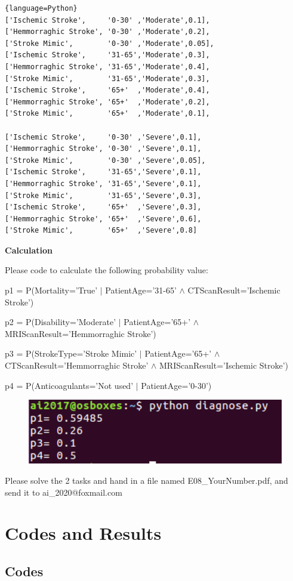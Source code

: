 \documentclass[a4paper, 11pt]{article}
\begin{document}
\begin{lstlisting}{language=Python}
['Ischemic Stroke',     '0-30' ,'Moderate',0.1],
['Hemmorraghic Stroke', '0-30' ,'Moderate',0.2],
['Stroke Mimic',        '0-30' ,'Moderate',0.05],
['Ischemic Stroke',     '31-65','Moderate',0.3],
['Hemmorraghic Stroke', '31-65','Moderate',0.4],
['Stroke Mimic',        '31-65','Moderate',0.3],
['Ischemic Stroke',     '65+'  ,'Moderate',0.4],
['Hemmorraghic Stroke', '65+'  ,'Moderate',0.2],
['Stroke Mimic',        '65+'  ,'Moderate',0.1],

['Ischemic Stroke',     '0-30' ,'Severe',0.1],
['Hemmorraghic Stroke', '0-30' ,'Severe',0.1],
['Stroke Mimic',        '0-30' ,'Severe',0.05],
['Ischemic Stroke',     '31-65','Severe',0.1],
['Hemmorraghic Stroke', '31-65','Severe',0.1],
['Stroke Mimic',        '31-65','Severe',0.3],
['Ischemic Stroke',     '65+'  ,'Severe',0.3],
['Hemmorraghic Stroke', '65+'  ,'Severe',0.6],
['Stroke Mimic',        '65+'  ,'Severe',0.8]
\end{lstlisting}
\textbf{Calculation}

Please code to calculate the following probability value:

p1 = P(Mortality='True' $|$ PatientAge='31-65' $\land$ CTScanResult='Ischemic Stroke')

p2 = P(Disability='Moderate' $|$ PatientAge='65+' $\land$  MRIScanResult='Hemmorraghic Stroke')

p3 = P(StrokeType='Stroke Mimic' $|$ PatientAge='65+' $\land$ CTScanResult='Hemmorraghic Stroke' $\land$ MRIScanResult='Ischemic Stroke')

p4 = P(Anticoagulants='Not used' $|$ PatientAge='0-30')

\begin{figure}[ht]
\centering
\includegraphics[width=12cm]{Pic/diagnose_result}
\end{figure}

Please solve the 2 tasks and hand in a file named \textsf{E08\_YourNumber.pdf}, and send it to \textsf{ai\_2020@foxmail.com}


\section{Codes and Results}
\subsection{Codes}
\end{document}
